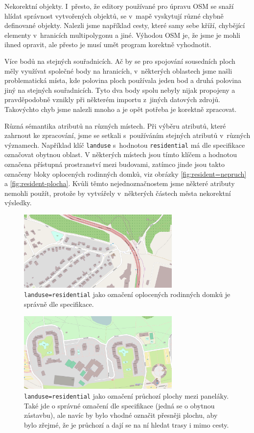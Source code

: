 \smallskip
{\tuc Nekorektní objekty.} I~přesto, že editory používané pro úpravu OSM se snaží
hlídat správnost vytvořených objektů, se v~mapě vyskytují různé chybně
definované objekty. Nalezli jsme například cesty, které samy sebe kříží,
chybějící elementy v~hranicích multipolygonu a jiné. Výhodou OSM je, že jsme je
mohli ihned opravit, ale přesto je musí umět program korektně vyhodnotit.

\smallskip
{\tuc Více bodů na stejných souřadnicích.} Ač by se pro spojování sousedních
ploch měly využívat společné body na hranicích, v~některých oblastech jsme našli
problematická místa, kde polovina ploch používala jeden bod a druhá polovina
jiný na stejných souřadnicích. Tyto dva body spolu nebyly nijak propojeny a
pravděpodobně vznikly při některém importu z~jiných datových zdrojů. Takovýchto
chyb jsme nalezli mnoho a je opět potřeba je korektně zpracovat.

\smallskip
{\tuc Různá sémantika atributů na různých místech.} Při výběru atributů, které
zahrnout ke zpracování, jsme se setkali s~používáním stejných atributů v~různých
významech. Například klíč \verb|landuse| s~hodnotou \verb|residential| má dle
specifikace \cite{osmfeatures} označovat obytnou oblast. V některých místech
jsou tímto klíčem a hodnotou označena přístupná prostranství mezi budovami,
zatímco jinde jsou takto označeny bloky oplocených rodinných domků, viz obrázky
\ref{fig:resident=nepruch} a \ref{fig:resident-plocha}.
Kvůli těmto nejednoznačnostem jsme některé atributy nemohli použít, protože by
vytvářely v~některých částech města nekorektní výsledky.
\begin{figure}
	\centering
	\includegraphics[width=80mm]{../img/resident-nepruch.pdf}
	\caption{\texttt{landuse=residential} jako označení oplocených rodinných
	domků je správně dle specifikace.}
	\label{fig:resident-nepruch}
\end{figure}
\begin{figure}
	\centering
	\includegraphics[width=80mm]{../img/resident-plocha.pdf}
	\caption{\texttt{landuse=residential} jako označení průchozí plochy mezi
	paneláky. Také jde o správné označení dle specifikace (jedná se o
	obytnou zástavbu), ale navíc by bylo vhodné označit přesněji plochu, aby
	bylo zřejmé, že je průchozí a dají se na ní hledat trasy i mimo cesty.}
	\label{fig:resident-volno}
\end{figure}

